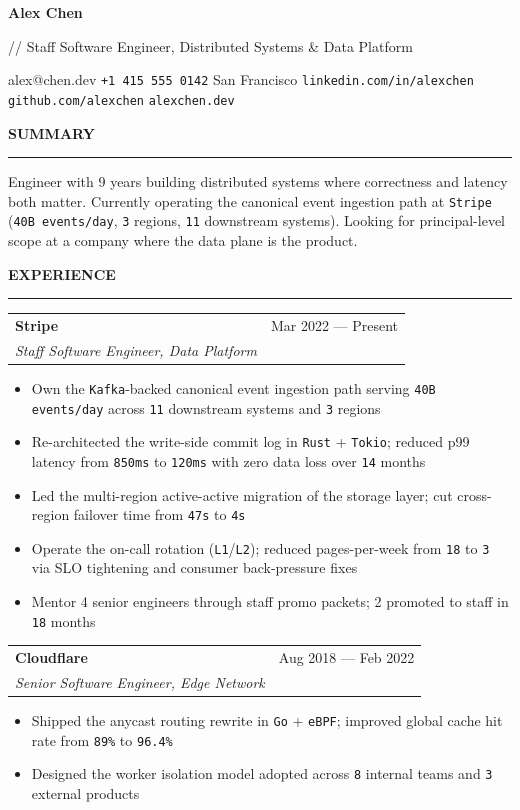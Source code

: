 \documentclass[letterpaper,10pt]{article}
\makeatletter
\newcommand{\enghead}[1]{%
  \vspace{12pt}
  {\ttfamily\bfseries\fontsize{9.5}{12}\selectfont\textcolor{engBody}{\MakeUppercase{#1}}}
  \vspace{4pt}
  \noindent\textcolor{engDiv}{\rule{\linewidth}{0.5pt}}
  \vspace{4pt}
}
\newcommand{\role}[3]{%
  \vspace{4pt}
  \begin{tabularx}{\linewidth}{@{}Xr@{}}
    \textbf{#1} & \ttfamily\textcolor{engSec}{#3} \\
    \textit{#2} & \\
  \end{tabularx}
  \vspace{2pt}
}
\newcommand{\m}[1]{\texttt{\small #1}}
\makeatother
\begin{document}
{\bfseries\fontsize{22}{26}\selectfont\textcolor{engBody}{Alex Chen}}

\vspace{2pt}
{\ttfamily\fontsize{10.5}{14}\selectfont\textcolor{engBody}{// Staff Software Engineer, Distributed Systems \& Data Platform}}

\vspace{8pt}
{\fontsize{10}{14}\selectfont\textcolor{engBody}{alex@chen.dev \textperiodcentered{} \texttt{+1 415 555 0142} \textperiodcentered{} San Francisco \textperiodcentered{} \texttt{linkedin.com/in/alexchen} \textperiodcentered{} \texttt{github.com/alexchen} \textperiodcentered{} \texttt{alexchen.dev}}}

\vspace{8pt}

\enghead{Summary}
Engineer with 9 years building distributed systems where correctness and latency both matter. Currently operating the canonical event ingestion path at \m{Stripe} (\m{40B events/day}, \m{3} regions, \m{11} downstream systems). Looking for principal-level scope at a company where the data plane is the product.

\enghead{Experience}

\role{Stripe}{Staff Software Engineer, Data Platform}{Mar 2022 --- Present}
\begin{itemize}
  \item Own the \m{Kafka}-backed canonical event ingestion path serving \m{40B events/day} across \m{11} downstream systems and \m{3} regions
  \item Re-architected the write-side commit log in \m{Rust} + \m{Tokio}; reduced p99 latency from \m{850ms} to \m{120ms} with zero data loss over \m{14} months
  \item Led the multi-region active-active migration of the storage layer; cut cross-region failover time from \m{47s} to \m{4s}
  \item Operate the on-call rotation (\m{L1}/\m{L2}); reduced pages-per-week from \m{18} to \m{3} via SLO tightening and consumer back-pressure fixes
  \item Mentor 4 senior engineers through staff promo packets; 2 promoted to staff in \m{18} months
\end{itemize}

\role{Cloudflare}{Senior Software Engineer, Edge Network}{Aug 2018 --- Feb 2022}
\begin{itemize}
  \item Shipped the anycast routing rewrite in \m{Go} + \m{eBPF}; improved global cache hit rate from \m{89\%} to \m{96.4\%}
  \item Designed the worker isolation model adopted across \m{8} internal teams and \m{3} external products
\end{itemize}
\end{document}
